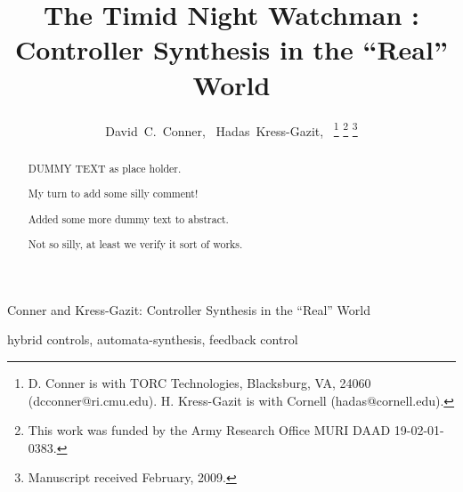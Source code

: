 \documentclass[journal,twoside]{IEEEtran}
\def \TROTITLE {{ The Timid Night Watchman :\\ Controller Synthesis in the ``Real'' World}}
\def \SHORTTROTITLE {{ Controller Synthesis in the ``Real'' World }}
\begin{document}
%

\title{\TROTITLE}

\author{David~C.~Conner,~
  Hadas~Kress-Gazit,~%
  \thanks{D. Conner is with TORC Technologies, Blacksburg, VA, 24060
    (dcconner@ri.cmu.edu).  H. Kress-Gazit is with Cornell
    (hadas@cornell.edu).}%
  \thanks{This work was funded by the Army Research Office MURI DAAD
    19-02-01-0383.}%
  \thanks{Manuscript received February, 2009.}
 }

{Conner and Kress-Gazit: \SHORTTROTITLE }


\maketitle


\begin{abstract}

  DUMMY TEXT as place holder. 

  My turn to add some silly comment! 

  Added some more dummy text to abstract.

  Not so silly, at least we verify it sort of works.

\end{abstract}


\begin{IEEEkeywords}
  hybrid controls, automata-synthesis, feedback control
\end{IEEEkeywords}

%
\IEEEpeerreviewmaketitle
\end{document}

